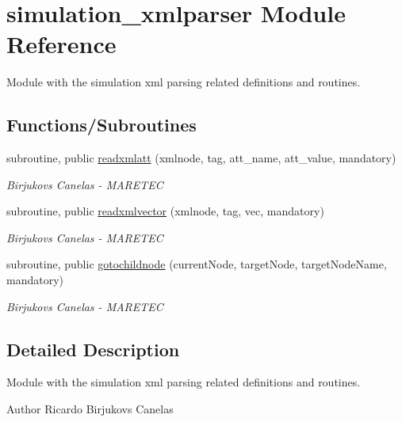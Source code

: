 \hypertarget{namespacesimulation__xmlparser}{}\section{simulation\+\_\+xmlparser Module Reference}
\label{namespacesimulation__xmlparser}


Module with the simulation xml parsing related definitions and routines.  


\subsection*{Functions/\+Subroutines}
\begin{DoxyCompactItemize}
\item 
subroutine, public \hyperlink{namespacesimulation__xmlparser_ae5a51c63402f76781f333aead6d1084d}{readxmlatt} (xmlnode, tag, att\+\_\+name, att\+\_\+value, mandatory)
\begin{DoxyCompactList}\small\item\em Birjukovs Canelas -\/ M\+A\+R\+E\+T\+EC \end{DoxyCompactList}\item 
subroutine, public \hyperlink{namespacesimulation__xmlparser_aa20b02586a497ea7ef90cb5b05cb2af7}{readxmlvector} (xmlnode, tag, vec, mandatory)
\begin{DoxyCompactList}\small\item\em Birjukovs Canelas -\/ M\+A\+R\+E\+T\+EC \end{DoxyCompactList}\item 
subroutine, public \hyperlink{namespacesimulation__xmlparser_a9a66c3a491ca567688fef7148e2d12d8}{gotochildnode} (current\+Node, target\+Node, target\+Node\+Name, mandatory)
\begin{DoxyCompactList}\small\item\em Birjukovs Canelas -\/ M\+A\+R\+E\+T\+EC \end{DoxyCompactList}\end{DoxyCompactItemize}


\subsection{Detailed Description}
Module with the simulation xml parsing related definitions and routines. 

\begin{DoxyAuthor}{Author}
Ricardo Birjukovs Canelas 
\end{DoxyAuthor}



